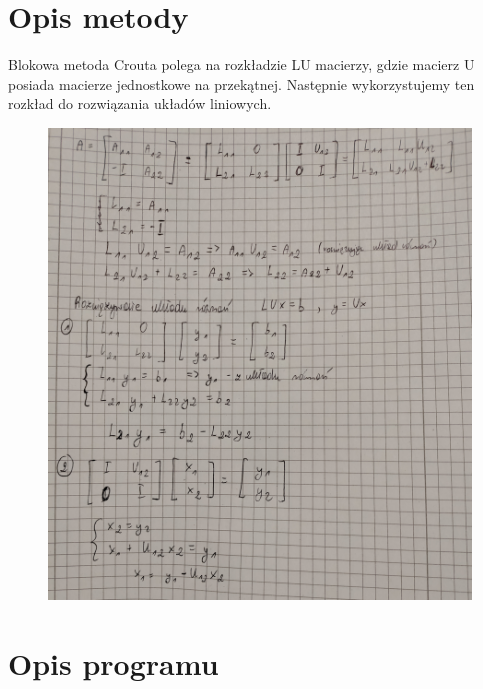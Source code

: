 \documentclass[11pt]{article}
\begin{document}
\section{Opis metody}
Blokowa metoda Crouta polega na rozkładzie LU macierzy, gdzie macierz U posiada macierze jednostkowe na przekątnej. Następnie wykorzystujemy ten rozkład do rozwiązania układów liniowych.
\begin{figure}[h]
    \includegraphics[scale=0.12]{metoda.jpg}
    \centering
\end{figure}

\break
\section{Opis programu}
\end{document}
